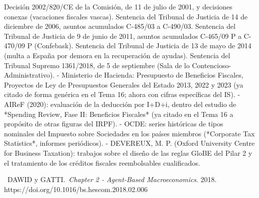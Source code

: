 \documentclass[10pt,a4paper]{article}
\newcounter{myref}
\newcommand{\MyBibItem}[4]{%
  \refstepcounter{myref}%
  \noindent[\themyref]\ #1.\ \emph{#2}. #3. #4\par
}
\begin{document}
Decisión 2002/820/CE de la Comisión, de 11 de julio de 2001, y decisiones conexas (vacaciones fiscales vascas).
Sentencia del Tribunal de Justicia de 14 de diciembre de 2006, asuntos acumulados C-485/03 a C-490/03.
Sentencia del Tribunal de Justicia de 9 de junio de 2011, asuntos acumulados C-465/09 P a C-470/09 P (Confebask).
Sentencia del Tribunal de Justicia de 13 de mayo de 2014 (multa a España por demora en la recuperación de ayudas).
Sentencia del Tribunal Supremo 1361/2018, de 5 de septiembre (Sala de lo Contencioso-Administrativo).
- Ministerio de Hacienda: Presupuesto de Beneficios Fiscales, Proyectos de Ley de Presupuestos Generales del Estado 2013, 2022 y 2023 (ya citado de forma genérica en el Tema 16; ahora con cifras específicas del IS).
- AIReF (2020): evaluación de la deducción por I+D+i, dentro del estudio de *Spending Review, Fase II: Beneficios Fiscales* (ya citado en el Tema 16 a propósito de otras figuras del IRPF).
- OCDE: series históricas de tipos nominales del Impuesto sobre Sociedades en los países miembros (*Corporate Tax Statistics*, informes periódicos).
- DEVEREUX, M. P. (Oxford University Centre for Business Taxation): trabajos sobre el diseño de las reglas GloBE del Pilar 2 y el tratamiento de los créditos fiscales reembolsables cualificados.


\MyBibItem{DAWID y GATTI}{Chapter 2 - Agent-Based Macroeconomics}{2018}{https://doi.org/10.1016/bs.hescom.2018.02.006}


\clearpage
\end{document}
